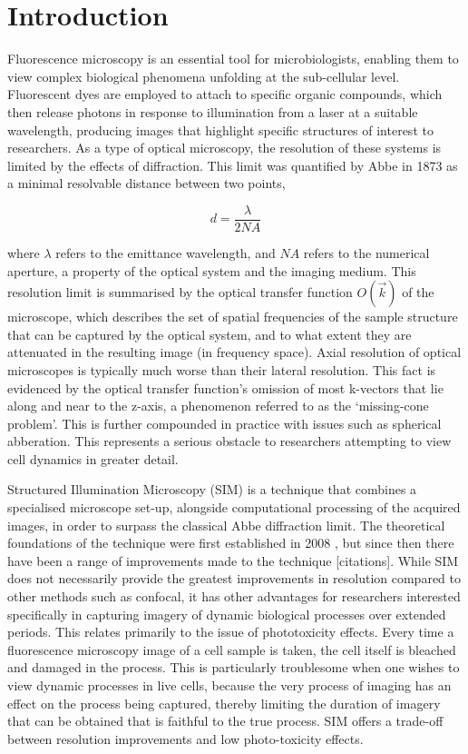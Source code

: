 \documentclass[12pt]{article}
\newcommand\NA{\mathit{NA}}
\begin{document}
\newpage
\tableofcontents

\newpage
{}
\section{Introduction}

Fluorescence microscopy is an essential tool for microbiologists,
enabling them to view complex biological phenomena unfolding at the sub-cellular level.
Fluorescent dyes are employed to attach to specific organic compounds,
which then release photons in response to illumination from a laser at a suitable wavelength,
producing images that highlight specific structures of interest to researchers.
As a type of optical microscopy, the resolution of these systems is limited by the effects of diffraction.
This limit was quantified by Abbe \cite{abbe} in 1873 as a minimal resolvable distance between two points,

\[d=\frac{\lambda}{2\NA}\]

where $\lambda$ refers to the emittance wavelength, and $\NA$ refers to the numerical aperture,
a property of the optical system and the imaging medium.
This resolution limit is summarised by the optical transfer function $O(\vec{k})$ of the microscope,
which describes the set of spatial frequencies of the sample structure that can be captured by the optical system,
and to what extent they are attenuated in the resulting image (in frequency space).
Axial resolution of optical microscopes is typically much worse than their lateral resolution.
This fact is evidenced by the optical transfer function's omission of most k-vectors that lie along and near to the z-axis,
a phenomenon referred to as the `missing-cone problem'.
This is further compounded in practice with issues such as spherical abberation.
This represents a serious obstacle to researchers attempting to view cell dynamics in greater detail.

Structured Illumination Microscopy (SIM) is a technique that combines a specialised microscope set-up,
alongside computational processing of the acquired images,
in order to surpass the classical Abbe diffraction limit.
The theoretical foundations of the technique were first established in 2008 \cite{originalSIM},
but since then there have been a range of improvements made to the technique [citations].
While SIM does not necessarily provide the greatest improvements in resolution compared to other methods such as confocal,
it has other advantages for researchers interested specifically in capturing imagery of dynamic biological processes over extended periods.
This relates primarily to the issue of phototoxicity effects.
Every time a fluorescence microscopy image of a cell sample is taken, the cell itself is bleached and damaged in the process.
This is particularly troublesome when one wishes to view dynamic processes in live cells,
because the very process of imaging has an effect on the process being captured,
thereby limiting the duration of imagery that can be obtained that is faithful to the true process.
SIM offers a trade-off between resolution improvements and low photo-toxicity effects.
\end{document}
